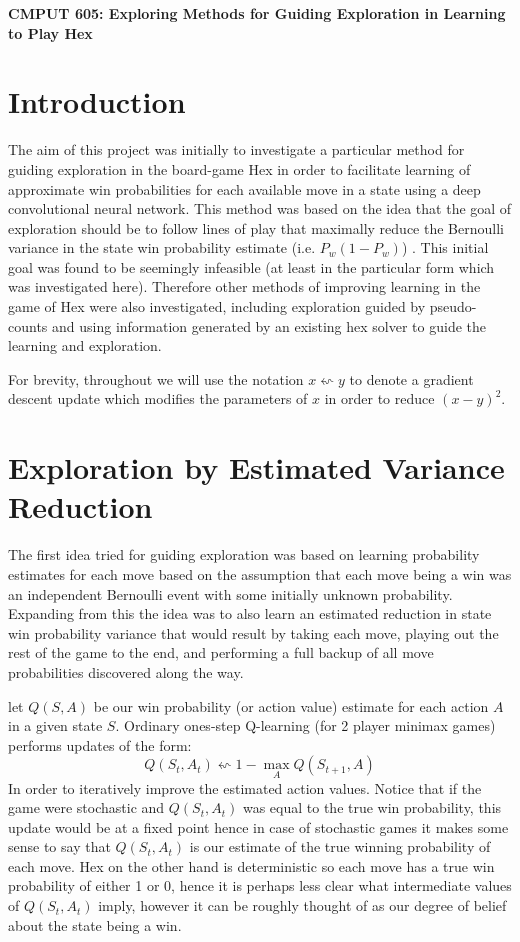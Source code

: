 \documentclass{article}
\begin{document}
\begin{center}
{\Large \textbf{CMPUT 605: Exploring Methods for Guiding Exploration in Learning to Play Hex}}
\end{center}
\section*{Introduction}
The aim of this project was initially to investigate a particular method for guiding exploration in the board-game Hex in order to facilitate learning of approximate win probabilities for each available move in a state using a deep convolutional neural network. This method was based on the idea that the goal of exploration should be to follow lines of play that maximally reduce the Bernoulli variance in the state win probability estimate (i.e. $P_w(1-P_w)$) . This initial goal was found to be seemingly infeasible (at least in the particular form which was investigated here). Therefore other methods of improving learning in the game of Hex were also investigated, including exploration guided by pseudo-counts and using information generated by an existing hex solver to guide the learning and exploration.

For brevity, throughout we will use the notation $x\leftsquigarrow y$ to denote a gradient descent update which modifies the parameters of $x$ in order to reduce $(x-y)^2$.

\section*{Exploration by Estimated Variance Reduction}
The first idea tried for guiding exploration was based on learning probability estimates for each move based on the assumption that each move being a win was an independent Bernoulli event with some initially unknown probability. Expanding from this the idea was to also learn an estimated reduction in state win probability variance that would result by taking each move, playing out the rest of the game to the end, and performing a full backup of all move probabilities discovered along the way.

let $Q(S,A)$ be our win probability (or action value) estimate for each action $A$ in a given state $S$. Ordinary ones-step Q-learning (for 2 player minimax games) performs updates of the form:
$$Q(S_t,A_t)\leftsquigarrow 1-\max_A Q(S_{t+1},A)$$
In order to iteratively improve the estimated action values. Notice that if the game were stochastic and $Q(S_t,A_t)$ was equal to the true win probability, this update would be at a fixed point hence in case of stochastic games it makes some sense to say that $Q(S_t,A_t)$ is our estimate of the true winning probability of each move. Hex on the other hand is deterministic so each move has a true win probability of either 1 or 0, hence it is perhaps less clear what intermediate values of $Q(S_t,A_t)$ imply, however it can be roughly thought of as our degree of belief about the state being a win.
\end{document}
